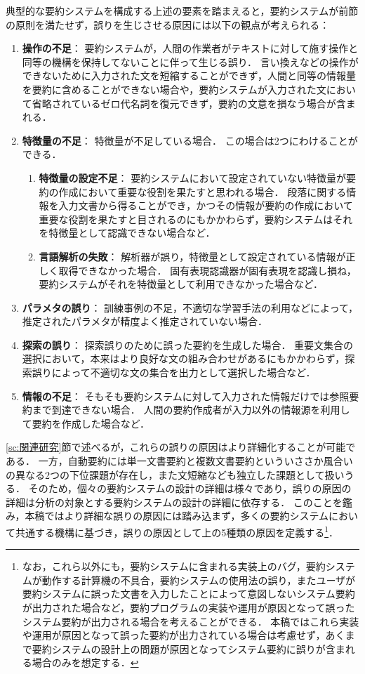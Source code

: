典型的な要約システムを構成する上述の要素を踏まえると，要約システムが前節の原則を満たせず，誤りを生じさせる原因には以下の観点が考えられる：

\begin{enumerate}
\item
{\bf 操作の不足}：
要約システムが，人間の作業者がテキストに対して施す操作と同等の機構を保持してないことに伴って生じる誤り．
言い換えなどの操作ができないために入力された文を短縮することができず，人間と同等の情報量を要約に含めることができない場合や，要約システムが入力された文において省略されているゼロ代名詞を復元できず，要約の文意を損なう場合が含まれる．
\item
{\bf 特徴量の不足}：
特徴量が不足している場合．
この場合は2つにわけることができる．
\begin{enumerate}
\item
{\bf 特徴量の設定不足}：
要約システムにおいて設定されていない特徴量が要約の作成において重要な役割を果たすと思われる場合．
段落に関する情報を入力文書から得ることができ，かつその情報が要約の作成において重要な役割を果たすと目されるのにもかかわらず，要約システムはそれを特徴量として認識できない場合など．
\item
{\bf 言語解析の失敗}：
解析器が誤り，特徴量として設定されている情報が正しく取得できなかった場合．
固有表現認識器が固有表現を認識し損ね，要約システムがそれを特徴量として利用できなかった場合など．
\end{enumerate}
\item
{\bf パラメタの誤り}：
訓練事例の不足，不適切な学習手法の利用などによって，推定されたパラメタが精度よく推定されていない場合．
\item
{\bf 探索の誤り}：
探索誤りのために誤った要約を生成した場合．
重要文集合の選択において，本来はより良好な文の組み合わせがあるにもかかわらず，探索誤りによって不適切な文の集合を出力として選択した場合など．
\item
{\bf 情報の不足}：
そもそも要約システムに対して入力された情報だけでは参照要約まで到達できない場合．
人間の要約作成者が入力以外の情報源を利用して要約を作成した場合など．
\end{enumerate}

\ref{sc:関連研究}節で述べるが，これらの誤りの原因はより詳細化することが可能である．
一方，自動要約には単一文書要約と複数文書要約といういささか風合いの異なる2つの下位課題が存在し，また文短縮なども独立した課題として扱いうる．
そのため，個々の要約システムの設計の詳細は様々であり，誤りの原因の詳細は分析の対象とする要約システムの設計の詳細に依存する．
このことを鑑み，本稿ではより詳細な誤りの原因には踏み込まず，多くの要約システムにおいて共通する機構に基づき，誤りの原因として上の5種類の原因を定義する\footnote{
なお，これら以外にも，要約システムに含まれる実装上のバグ，要約システムが動作する計算機の不具合，要約システムの使用法の誤り，またユーザが要約システムに誤った文書を入力したことによって意図しないシステム要約が出力された場合など，要約プログラムの実装や運用が原因となって誤ったシステム要約が出力される場合を考えることができる．
本稿ではこれら実装や運用が原因となって誤った要約が出力されている場合は考慮せず，あくまで要約システムの設計上の問題が原因となってシステム要約に誤りが含まれる場合のみを想定する．}．



